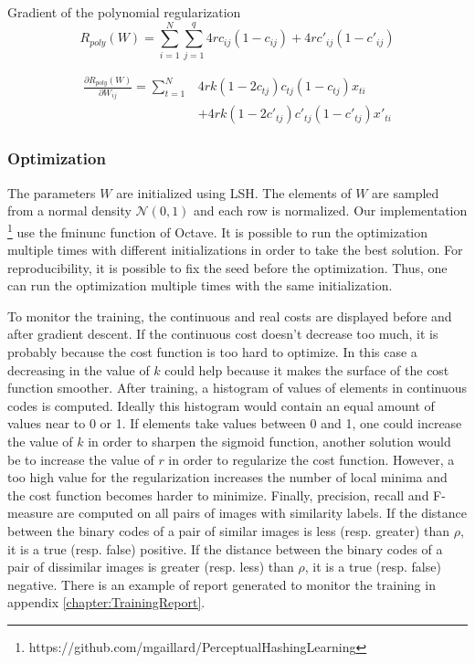 Gradient of the polynomial regularization
\[
	R_{poly}(W) = \sum\limits_{i=1}^N \sum\limits_{j=1}^q 4r c_{ij}(1 - c_{ij}) + 4r c'_{ij}(1 - c'_{ij})
\]

\[
\begin{split}
	\frac{\partial R_{poly}(W)}{\partial W_{ij}} = \sum\limits_{t=1}^N &   4rk (1-2c_{tj}) c_{tj} (1 - c_{tj}) x_{ti}    \\
	                                                                   & + 4rk (1-2c'_{tj}) c'_{tj} (1 - c'_{tj}) x'_{ti}
\end{split}
\]

\subsubsection{Optimization}
The parameters $W$ are initialized using LSH. The elements of $W$ are sampled from a normal density $\mathcal{N}(0, 1)$ and each row is normalized. Our implementation \footnote{https://github.com/mgaillard/PerceptualHashingLearning} use the fminunc function of Octave. It is possible to run the optimization multiple times with different initializations in order to take the best solution. For reproducibility, it is possible to fix the seed before the optimization. Thus, one can run the optimization multiple times with the same initialization.

To monitor the training, the continuous and real costs are displayed before and after gradient descent. If the continuous cost doesn't decrease too much, it is probably because the cost function is too hard to optimize. In this case a decreasing in the value of $k$ could help because it makes the surface of the cost function smoother. After training, a histogram of values of elements in continuous codes is computed. Ideally this histogram would contain an equal amount of values near to 0 or 1. If elements take values between 0 and 1, one could increase the value of $k$ in order to sharpen the sigmoid function, another solution would be to increase the value of $r$ in order to regularize the cost function. However, a too high value for the regularization increases the number of local minima and the cost function becomes harder to minimize. Finally, precision, recall and F-measure are computed on all pairs of images with similarity labels. If the distance between the binary codes of a pair of similar images is less (resp. greater) than $\rho$, it is a true (resp. false) positive. If the distance between the binary codes of a pair of dissimilar images is greater (resp. less) than $\rho$, it is a true (resp. false) negative. There is an example of report generated to monitor the training in appendix \ref{chapter:TrainingReport}.

